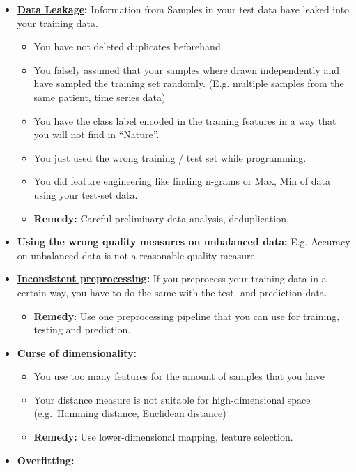 \documentclass[
]{book}
\providecommand{\tightlist}{%
  \setlength{\itemsep}{0pt}\setlength{\parskip}{0pt}}
\begin{document}
\begin{itemize}
\item
  \href{https://scikit-learn.org/stable/common_pitfalls.html\#data-leakage}{\textbf{Data
  Leakage}}\textbf{:}
  Information from Samples in your test data have leaked into your
  training data.

  \begin{itemize}
  \tightlist
  \item
    You have not deleted duplicates beforehand
  \item
    You falsely assumed that your samples where drawn independently
    and have sampled the training set randomly. (E.g. multiple
    samples from the same patient, time series data)
  \item
    You have the class label encoded in the training features in a
    way that you will not find in ``Nature''.
  \item
    You just used the wrong training / test set while programming.
  \item
    You did feature engineering like finding n-grams or Max, Min of
    data using your test-set data.
  \item
    \textbf{Remedy:} Careful preliminary data analysis, deduplication,
  \end{itemize}
\item
  \textbf{Using the wrong quality measures on unbalanced data:} E.g.
  Accuracy on unbalanced data is not a reasonable quality measure.
\item
  \href{https://scikit-learn.org/stable/common_pitfalls.html\#inconsistent-preprocessing}{\textbf{Inconsistent
  preprocessing}}\textbf{:}
  If you preprocess your training data in a certain way, you have to
  do the same with the test- and prediction-data.

  \begin{itemize}
  \tightlist
  \item
    \textbf{Remedy}: Use one preprocessing pipeline that you can use for
    training, testing and prediction.
  \end{itemize}
\item
  \textbf{Curse of dimensionality:}

  \begin{itemize}
  \tightlist
  \item
    You use too many features for the amount of samples that you
    have
  \item
    Your distance measure is not suitable for high-dimensional space
    (e.g.~Hamming distance, Euclidean distance)
  \item
    \textbf{Remedy:} Use lower-dimensional mapping, feature selection.
  \end{itemize}
\item
  \textbf{Overfitting:}


\end{itemize}
\end{document}
